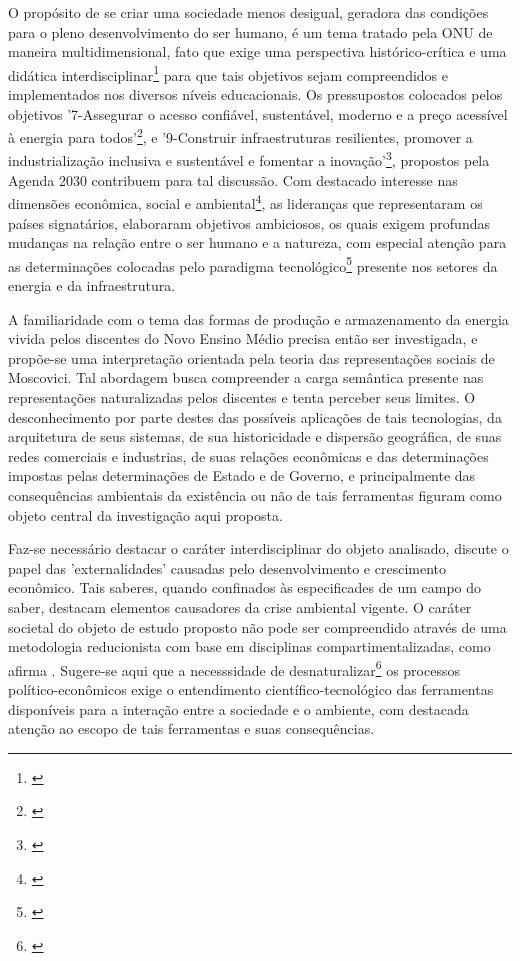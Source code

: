 \documentclass[
   article,       %
   12pt,          %
   oneside,       %
   a4paper,       %
   english,       %
   brazil,           %
   sumario=tradicional
   ]{abntex2}
\begin{document}
O propósito de se criar uma sociedade menos desigual, geradora das condições para o pleno desenvolvimento do ser humano, é um tema tratado pela ONU de maneira multidimensional, fato que exige uma perspectiva histórico-crítica e uma didática interdisciplinar\footnote{\cite[Cap.~7-9]{Lincoln1985-ua}} para que tais objetivos sejam compreendidos e implementados nos diversos níveis educacionais. Os pressupostos colocados pelos objetivos '7-Assegurar o acesso confiável, sustentável, moderno e a preço
acessível à energia para todos'\footnote{\cite[p. 21]{Agenda_2030}}, e '9-Construir infraestruturas resilientes, promover a industrialização inclusiva e sustentável e fomentar a inovação'\footnote{\cite[p. 22]{Agenda_2030}}, propostos pela Agenda 2030 contribuem para tal discussão. Com destacado interesse nas dimensões econômica, social e ambiental\footnote{\cite[p. 6]{Agenda_2030}}, as lideranças que representaram os países signatários, elaboraram objetivos ambiciosos, os quais exigem profundas mudanças na relação entre o ser humano e a natureza, com especial atenção para as determinações colocadas pelo paradigma tecnológico\footnote{\cite[Cap.~3]{Kuhn2012-oa}} presente nos setores da energia e da infraestrutura.

A familiaridade com o tema das formas de produção e armazenamento da energia vivida pelos discentes do Novo Ensino Médio precisa então ser investigada, e propõe-se uma interpretação orientada pela teoria das representações sociais de Moscovici. Tal abordagem busca compreender a carga semântica presente nas representações naturalizadas pelos discentes e tenta perceber seus limites. O desconhecimento por parte destes das possíveis aplicações de tais tecnologias, da arquitetura de seus sistemas, de sua historicidade e dispersão geográfica, de suas redes comerciais e industrias, de suas relações econômicas e das determinações impostas pelas determinações de Estado e de Governo, e principalmente das consequências ambientais da existência ou não de tais ferramentas figuram como objeto central da investigação aqui proposta.

Faz-se necessário destacar o caráter interdisciplinar do objeto analisado, \cite[p.19]{Interdisciplinar_Complexidade} discute o papel das 'externalidades' causadas pelo desenvolvimento e crescimento econômico. Tais saberes, quando confinados às especificades de um campo do saber, destacam elementos causadores da crise ambiental vigente. O caráter societal do objeto de estudo proposto não pode ser compreendido através de uma metodologia reducionista com base em disciplinas compartimentalizadas, como afirma \cite[p.53]{consideracoes_Interdisciplinaridade}. Sugere-se aqui que a necesssidade de desnaturalizar\footnote{\cite[p.29]{Interdisciplinar_Complexidade}} os processos político-econômicos exige o entendimento científico-tecnológico das ferramentas disponíveis para a interação entre a sociedade e o ambiente, com destacada atenção ao escopo de tais ferramentas e suas consequências.
\end{document}
